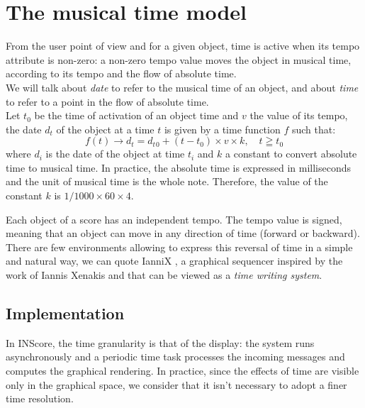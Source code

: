 \documentclass{article}
\begin{document}
\section{The musical time model}\label{mustime}

From the user point of view and for a given object, time is active when its tempo attribute is non-zero: a non-zero tempo value moves the object in musical time, according to its tempo and the flow of absolute time. \\
We will talk about \emph{date} to refer to the musical time of an object, and about \emph{time} to refer to a point in the flow of absolute time. \\

Let $t_0$ be the time of activation of an object time and $v$ the value of its tempo, the date $d_t$ of the object at a time $t$ is given by a time function $f$ such that:
\begin{equation}
	 f(t) \to d_t = d_t{_0} + (t - t_0) \times v \times k , \quad t \geqq t_0
\label{timeeq}
\end{equation}
where $d_i$ is the date of the object at time $t_i$ and $k$ a constant to convert absolute time to musical time. In practice, the absolute time is expressed in milliseconds and the unit of musical time is the whole note. Therefore, the value of the constant $k$ is $1/1000 \times 60 \times 4$.

Each object of a score has an independent tempo. The tempo value is signed, meaning that an object can move in any direction of time (forward or backward). There are few environments allowing to express this reversal of time in a simple and natural way, we can quote IanniX \cite{coduys04}, a graphical sequencer inspired by the work of Iannis Xenakis and that can be viewed as a \emph{time writing system}.


\subsection{Implementation}

In INScore, the time granularity is that of the display: the system runs asynchronously and a periodic time task processes the incoming messages and computes the graphical rendering. In practice, since the effects of time are visible only in the graphical space, we consider that it isn't necessary to adopt a finer time resolution.
\end{document}
